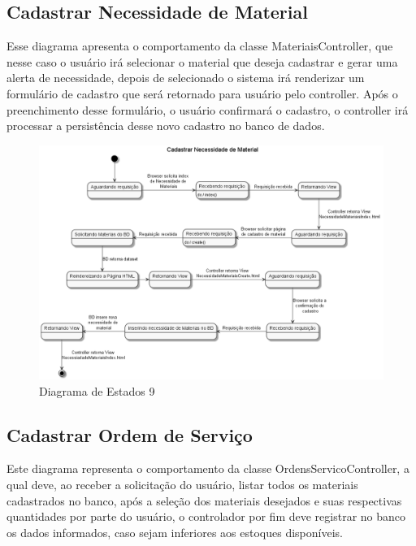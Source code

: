 \documentclass[rascunho,xindy,acronym,symbols]{fei}
\begin{document}
\subsection{Cadastrar Necessidade de Material}

Esse diagrama apresenta o comportamento da classe MateriaisController, que nesse caso o usuário irá selecionar o material que deseja cadastrar e gerar uma alerta de necessidade, depois de selecionado o sistema irá renderizar um formulário de cadastro que será retornado para usuário pelo controller. Após o preenchimento desse formulário, o usuário confirmará o cadastro, o controller irá processar a persistência desse novo cadastro no banco de dados.

\begin{figure}[H]
    \centering
    \includegraphics[width=\textwidth]{./Images/DE_-_Cadastrar_Necessidade_de_Material.png}
    \caption{Diagrama de Estados 9}
    \label{fig:diag_est9}
\end{figure}

\subsection{Cadastrar Ordem de Serviço}

Este diagrama representa o comportamento da classe OrdensServicoController, a qual deve, ao receber a solicitação do usuário, listar todos os materiais cadastrados no banco, após a seleção dos materiais desejados e suas respectivas quantidades por parte do usuário, o controlador por fim deve registrar no banco os dados informados, caso sejam inferiores aos estoques disponíveis.
\end{document}
